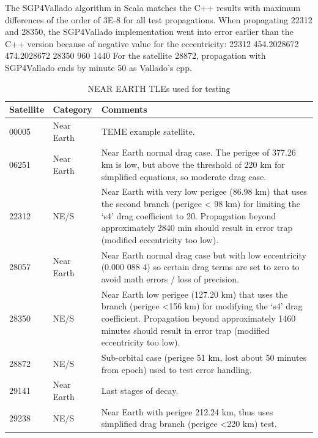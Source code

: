 \documentclass{article}
\begin{document}
The SGP4Vallado algorithm in Scala matches the C++ results with maximum differences
of the order of 3E-8 for all test propagations.
When propagating 22312 and 28350, the SGP4Vallado implementation went into error earlier
than the C++ version because of negative value for the eccentricity:
22312  454.2028672 474.2028672
28350  960         1440
For the satellite 28872, propagation with SGP4Vallado ends by minute 50 as Vallado's cpp.


\begin{table}[p]
\centering
\caption{NEAR EARTH TLEs used for testing}\vspace{2mm}
\begin{tabular}{|l|l|p{14cm}|}
\hline\hline
Satellite & Category & Comments\\
\hline
00005 & Near Earth & TEME example satellite.\\
06251 &  Near Earth  & Near Earth normal drag case. The perigee of 377.26 km is low, but above the threshold of 220
km for simplified equations, so moderate drag case.\\
22312  & NE/S  & Near Earth with very low perigee (86.98 km) that uses the second branch (perigee < 98 km)
for limiting the ‘s4’ drag coefficient to 20. Propagation beyond approximately 2840 min
should result in error trap (modified eccentricity too low).\\
28057 &  Near Earth  & Near Earth normal drag case but with low eccentricity (0.000 088 4) so certain drag terms are
set to zero to avoid math errors / loss of precision.\\
28350 & NE/S  & Near Earth low perigee (127.20 km) that uses the branch (perigee \textless 156 km) for modifying
the ‘s4’ drag coefficient. Propagation beyond approximately 1460 minutes should result in
error trap (modified eccentricity too low).\\
28872  & NE/S  & Sub-orbital case (perigee 51 km, lost about 50 minutes from epoch) used to test error handling.\\
29141  & Near Earth  & Last stages of decay.\\
29238  & NE/S  & Near Earth with perigee 212.24 km, thus uses simplified drag branch (perigee \textless 220 km) test.\\
\hline\hline
\end{tabular}
\label{tab:res}
\end{table}


\end{document}
